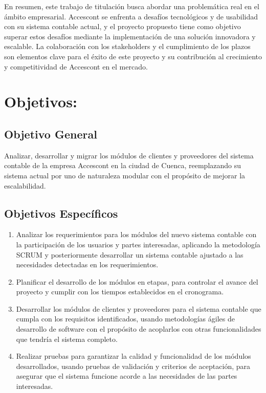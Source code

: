 \documentclass{article}
\begin{document}
 En resumen, este trabajo de titulación busca abordar una problemática real en el ámbito empresarial. Accescont se enfrenta a desafíos tecnológicos y de usabilidad con su sistema contable actual, y el proyecto propuesto tiene como objetivo superar estos desafíos mediante la implementación de una solución innovadora y escalable. La colaboración con los stakeholders y el cumplimiento de los plazos son elementos clave para el éxito de este proyecto y su contribución al crecimiento y competitividad de Accescont en el mercado. 

\section{Objetivos:}

\subsection{Objetivo General}

Analizar, desarrollar y migrar los módulos de clientes y proveedores del sistema contable de la empresa Accescont en la ciudad de Cuenca, reemplazando su sistema actual por uno de naturaleza modular con el propósito de mejorar la escalabilidad.

\subsection{Objetivos Específicos}

\begin{enumerate}
    \item Analizar los requerimientos para los módulos del nuevo sistema contable con la participación de los usuarios y partes interesadas, aplicando la metodología SCRUM y posteriormente desarrollar un sistema contable ajustado a las necesidades detectadas en los requerimientos.
    
    \item Planificar el desarrollo de los módulos en etapas, para controlar el avance del proyecto y cumplir con los tiempos establecidos en el cronograma.
    
    \item Desarrollar los módulos de clientes y proveedores para el sistema contable que cumpla con los requisitos identificados, usando metodologías ágiles de desarrollo de software con el propósito de acoplarlos con otras funcionalidades que tendría el sistema completo.
    
    \item Realizar pruebas para garantizar la calidad y funcionalidad de los módulos desarrollados, usando pruebas de validación y criterios de aceptación, para asegurar que el sistema funcione acorde a las necesidades de las partes interesadas.
\end{enumerate}
\end{document}
